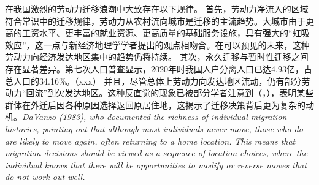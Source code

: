 \documentclass[a4paper,12pt]{article}
\begin{document}
在我国激烈的劳动力迁移浪潮中大致存在以下规律。
首先，劳动力净流入的区域符合常识中的迁移规律，劳动力从农村流向城市是迁移的主流趋势。大城市由于更高的工资水平、更丰富的就业资源、更高质量的基础服务设施，具有强大的“虹吸效应”，这一点与新经济地理学学者提出的观点相吻合。在可以预见的未来，这种劳动力向经济发达地区集中的趋势仍将持续。
其次，永久迁移与暂时性迁移之间存在显著差异。第七次人口普查显示，2020年时我国人户分离人口已达4.93亿，占总人口的34.16\%。（xxx）
并且，尽管总体上劳动力向发达地区流动，仍有部分劳动力“回流”到欠发达地区。这种反直觉的现象已被部分学者注意到（\cite{ShiZhiLeiJiaTingBingFuJiaTingJueCeYuNongCunQianYiLaoDongLiHuiLiu2012}，\cite{RenYuanNongCunWaiChuLaoDongLiHuiLiuQianYiDeYingXiangYinSuHeHuiLiuXiaoYing2017}），表明某些群体在外迁后因各种原因选择返回原居住地，这揭示了迁移决策背后更为复杂的动机。\textit{DaVanzo (1983), who documented the richness  of individual migration histories, pointing out that although most individuals never move,  those who do are likely to move again, often returning to a home location. This means  that migration decisions should be viewed as a sequence of location choices, where the  individual knows that there will be opportunities to modify or reverse moves that do not  work out well.}
\end{document}
